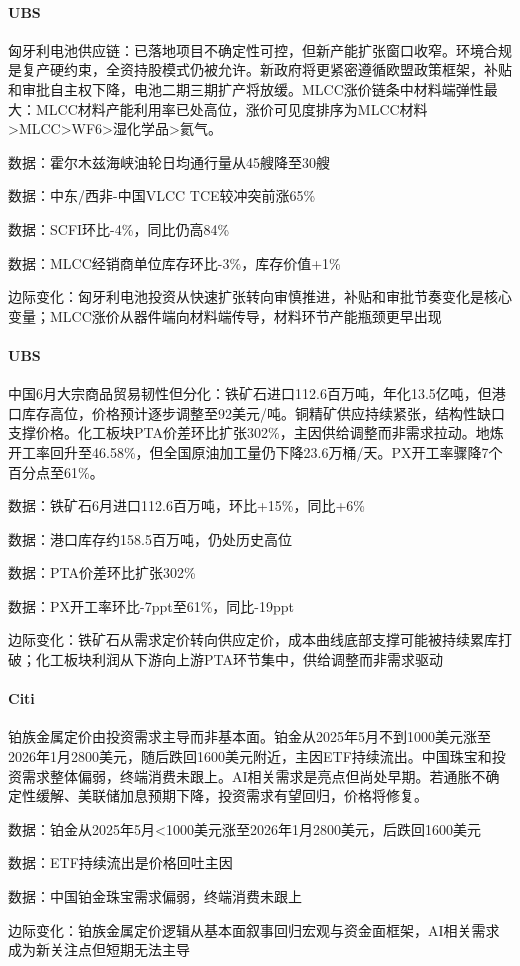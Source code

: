 \documentclass[11pt]{ctexart}
\begin{document}
\paragraph{UBS} 匈牙利电池供应链：已落地项目不确定性可控，但新产能扩张窗口收窄。环境合规是复产硬约束，全资持股模式仍被允许。新政府将更紧密遵循欧盟政策框架，补贴和审批自主权下降，电池二期三期扩产将放缓。MLCC涨价链条中材料端弹性最大：MLCC材料产能利用率已处高位，涨价可见度排序为MLCC材料>MLCC>WF6>湿化学品>氦气。
{\small\color{refgray}数据：霍尔木兹海峡油轮日均通行量从45艘降至30艘\par}
{\small\color{refgray}数据：中东/西非-中国VLCC TCE较冲突前涨65\%\par}
{\small\color{refgray}数据：SCFI环比-4\%，同比仍高84\%\par}
{\small\color{refgray}数据：MLCC经销商单位库存环比-3\%，库存价值+1\%\par}
{\small\color{refgray}边际变化：匈牙利电池投资从快速扩张转向审慎推进，补贴和审批节奏变化是核心变量；MLCC涨价从器件端向材料端传导，材料环节产能瓶颈更早出现\par}
\paragraph{UBS} 中国6月大宗商品贸易韧性但分化：铁矿石进口112.6百万吨，年化13.5亿吨，但港口库存高位，价格预计逐步调整至92美元/吨。铜精矿供应持续紧张，结构性缺口支撑价格。化工板块PTA价差环比扩张302\%，主因供给调整而非需求拉动。地炼开工率回升至46.58\%，但全国原油加工量仍下降23.6万桶/天。PX开工率骤降7个百分点至61\%。
{\small\color{refgray}数据：铁矿石6月进口112.6百万吨，环比+15\%，同比+6\%\par}
{\small\color{refgray}数据：港口库存约158.5百万吨，仍处历史高位\par}
{\small\color{refgray}数据：PTA价差环比扩张302\%\par}
{\small\color{refgray}数据：PX开工率环比-7ppt至61\%，同比-19ppt\par}
{\small\color{refgray}边际变化：铁矿石从需求定价转向供应定价，成本曲线底部支撑可能被持续累库打破；化工板块利润从下游向上游PTA环节集中，供给调整而非需求驱动\par}
\paragraph{Citi} 铂族金属定价由投资需求主导而非基本面。铂金从2025年5月不到1000美元涨至2026年1月2800美元，随后跌回1600美元附近，主因ETF持续流出。中国珠宝和投资需求整体偏弱，终端消费未跟上。AI相关需求是亮点但尚处早期。若通胀不确定性缓解、美联储加息预期下降，投资需求有望回归，价格将修复。
{\small\color{refgray}数据：铂金从2025年5月<1000美元涨至2026年1月2800美元，后跌回1600美元\par}
{\small\color{refgray}数据：ETF持续流出是价格回吐主因\par}
{\small\color{refgray}数据：中国铂金珠宝需求偏弱，终端消费未跟上\par}
{\small\color{refgray}边际变化：铂族金属定价逻辑从基本面叙事回归宏观与资金面框架，AI相关需求成为新关注点但短期无法主导\par}
\end{document}
